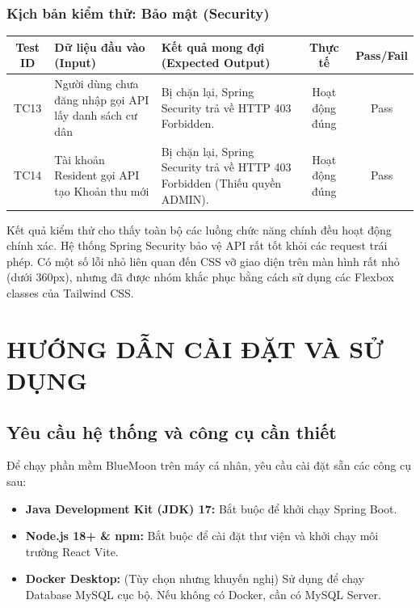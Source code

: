 \documentclass[12pt,a4paper]{article}
\begin{document}
\subsubsection{Kịch bản kiểm thử: Bảo mật (Security)}
\begin{table}[H]
    \centering
    \begin{tabularx}{\textwidth}{|c|L{4cm}|X|c|c|}
    \hline
    \textbf{Test ID} & \textbf{Dữ liệu đầu vào (Input)} & \textbf{Kết quả mong đợi (Expected Output)} & \textbf{Thực tế} & \textbf{Pass/Fail} \\
    \hline
    TC13 & Người dùng chưa đăng nhập gọi API lấy danh sách cư dân & Bị chặn lại, Spring Security trả về HTTP 403 Forbidden. & Hoạt động đúng & Pass \\
    \hline
    TC14 & Tài khoản Resident gọi API tạo Khoản thu mới & Bị chặn lại, Spring Security trả về HTTP 403 Forbidden (Thiếu quyền ADMIN). & Hoạt động đúng & Pass \\
    \hline
    \end{tabularx}
\end{table}

Kết quả kiểm thử cho thấy toàn bộ các luồng chức năng chính đều hoạt động chính xác. Hệ thống Spring Security bảo vệ API rất tốt khỏi các request trái phép. Có một số lỗi nhỏ liên quan đến CSS vỡ giao diện trên màn hình rất nhỏ (dưới 360px), nhưng đã được nhóm khắc phục bằng cách sử dụng các Flexbox classes của Tailwind CSS.

\section{HƯỚNG DẪN CÀI ĐẶT VÀ SỬ DỤNG}

\subsection{Yêu cầu hệ thống và công cụ cần thiết}
Để chạy phần mềm BlueMoon trên máy cá nhân, yêu cầu cài đặt sẵn các công cụ sau:
\begin{itemize}
    \item \textbf{Java Development Kit (JDK) 17:} Bắt buộc để khởi chạy Spring Boot.
    \item \textbf{Node.js 18+ \& npm:} Bắt buộc để cài đặt thư viện và khởi chạy môi trường React Vite.
    \item \textbf{Docker Desktop:} (Tùy chọn nhưng khuyến nghị) Sử dụng để chạy Database MySQL cục bộ. Nếu không có Docker, cần có MySQL Server.
\end{itemize}
\end{document}
